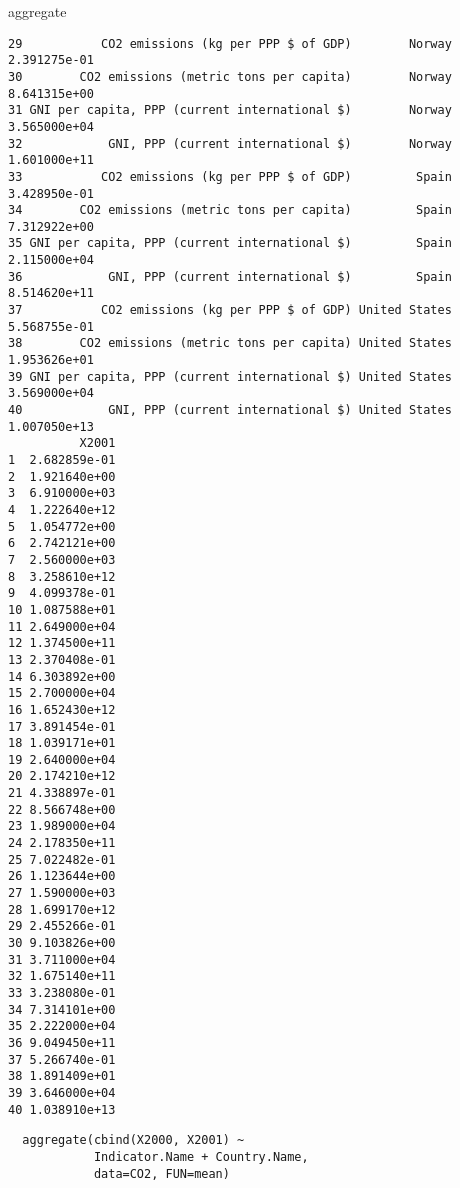\documentclass[xcolor={usenames,svgnames,dvipsnames}]{beamer}
\begin{document}
\begin{frame}[fragile,label=sec-3-7]{aggregate}
\begin{verbatim}
29           CO2 emissions (kg per PPP $ of GDP)        Norway 2.391275e-01
30        CO2 emissions (metric tons per capita)        Norway 8.641315e+00
31 GNI per capita, PPP (current international $)        Norway 3.565000e+04
32            GNI, PPP (current international $)        Norway 1.601000e+11
33           CO2 emissions (kg per PPP $ of GDP)         Spain 3.428950e-01
34        CO2 emissions (metric tons per capita)         Spain 7.312922e+00
35 GNI per capita, PPP (current international $)         Spain 2.115000e+04
36            GNI, PPP (current international $)         Spain 8.514620e+11
37           CO2 emissions (kg per PPP $ of GDP) United States 5.568755e-01
38        CO2 emissions (metric tons per capita) United States 1.953626e+01
39 GNI per capita, PPP (current international $) United States 3.569000e+04
40            GNI, PPP (current international $) United States 1.007050e+13
          X2001
1  2.682859e-01
2  1.921640e+00
3  6.910000e+03
4  1.222640e+12
5  1.054772e+00
6  2.742121e+00
7  2.560000e+03
8  3.258610e+12
9  4.099378e-01
10 1.087588e+01
11 2.649000e+04
12 1.374500e+11
13 2.370408e-01
14 6.303892e+00
15 2.700000e+04
16 1.652430e+12
17 3.891454e-01
18 1.039171e+01
19 2.640000e+04
20 2.174210e+12
21 4.338897e-01
22 8.566748e+00
23 1.989000e+04
24 2.178350e+11
25 7.022482e-01
26 1.123644e+00
27 1.590000e+03
28 1.699170e+12
29 2.455266e-01
30 9.103826e+00
31 3.711000e+04
32 1.675140e+11
33 3.238080e-01
34 7.314101e+00
35 2.222000e+04
36 9.049450e+11
37 5.266740e-01
38 1.891409e+01
39 3.646000e+04
40 1.038910e+13
\end{verbatim}

\lstset{language=R,label= ,caption= ,numbers=none}
\begin{lstlisting}
  aggregate(cbind(X2000, X2001) ~
            Indicator.Name + Country.Name,
            data=CO2, FUN=mean)
\end{lstlisting}


\end{frame}
\end{document}
